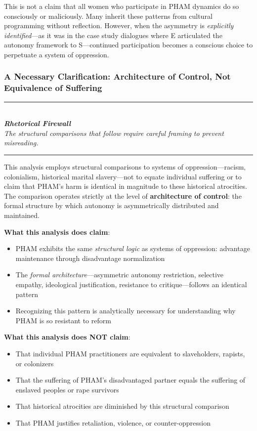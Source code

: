 \documentclass[12pt, letterpaper]{article}
\begin{document}
This is not a claim that all women who participate in PHAM dynamics do so consciously or maliciously. Many inherit these patterns from cultural programming without reflection. However, when the asymmetry is \textit{explicitly identified}---as it was in the case study dialogues where E articulated the autonomy framework to S---continued participation becomes a conscious choice to perpetuate a system of oppression.

\subsubsection{A Necessary Clarification: Architecture of Control, Not Equivalence of Suffering}

\begin{center}
\rule{0.6\textwidth}{0.4pt}\\[0.5em]
\textit{\textbf{Rhetorical Firewall}}\\[0.3em]
\textit{The structural comparisons that follow require careful framing to prevent misreading.}\\[0.5em]
\rule{0.6\textwidth}{0.4pt}
\end{center}

This analysis employs structural comparisons to systems of oppression---racism, colonialism, historical marital slavery---not to equate individual suffering or to claim that PHAM's harm is identical in magnitude to these historical atrocities. The comparison operates strictly at the level of \textbf{architecture of control}: the formal structure by which autonomy is asymmetrically distributed and maintained.

\textbf{What this analysis does claim}:
\begin{itemize}
    \item PHAM exhibits the same \textit{structural logic} as systems of oppression: advantage maintenance through disadvantage normalization
    \item The \textit{formal architecture}---asymmetric autonomy restriction, selective empathy, ideological justification, resistance to critique---follows an identical pattern
    \item Recognizing this pattern is analytically necessary for understanding why PHAM is so resistant to reform
\end{itemize}

\textbf{What this analysis does NOT claim}:
\begin{itemize}
    \item That individual PHAM practitioners are equivalent to slaveholders, rapists, or colonizers
    \item That the suffering of PHAM's disadvantaged partner equals the suffering of enslaved peoples or rape survivors
    \item That historical atrocities are diminished by this structural comparison
    \item That PHAM justifies retaliation, violence, or counter-oppression
\end{itemize}
\end{document}
